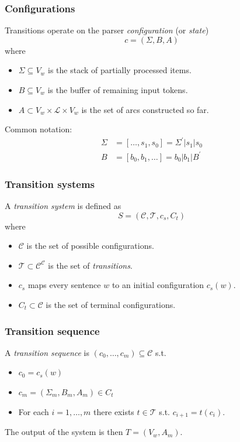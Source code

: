 \documentclass[t]{beamer}
\begin{document}
\begin{frame}
  \frametitle{Configurations}
  Transitions operate on the parser \textit{configuration} (or \textit{state})
  \[
    c = (\Sigma, B, A)
  \]
  where
  \begin{itemize}
    \item $\Sigma \subseteq V_w$ is the stack of partially processed items.
    \item $B \subseteq V_w$ is the buffer of remaining input tokens.
    \item $A \subset V_w \times \mathcal{L} \times V_w$ is the set of arcs constructed so far.
  \end{itemize}
  
  \pause\vfill
  
  Common notation:
  \begin{equation*}
  \begin{split}
      \Sigma&=[\ldots,s_1,s_0]=\Sigma^\prime|s_1|s_0 \\
      B&=[b_0,b_1,\ldots]=b_0|b_1|B^\prime
  \end{split}
  \end{equation*}
\end{frame}

\begin{frame}
  \frametitle{Transition systems}  
  
  A \textit{transition system} is defined as
  \[
    S = (\mathcal{C}, \mathcal{T}, c_s, C_t)
  \]
  where
  \begin{itemize}
    \item $\mathcal{C}$ is the set of possible configurations.
    \item $\mathcal{T} \subset \mathcal{C}^\mathcal{C}$ is the set of \textit{transitions}.
    \item $c_s$ maps every sentence $w$ to an initial configuration $c_s(w)$.
    \item $C_t \subset \mathcal{C}$ is the set of terminal configurations.
  \end{itemize}
\end{frame}

\begin{frame}
  \frametitle{Transition sequence}  
  A \textit{transition sequence} is $(c_0, \ldots, c_m) \subseteq \mathcal{C}$ s.t.
  \begin{itemize}
    \item $c_0 = c_s(w)$
    \item $c_m = (\Sigma_m, B_m, A_m) \in C_t$
    \item For each $i=1,\ldots,m$ there exists $t\in \mathcal{T}$ s.t. $c_{i+1}=t(c_i)$.
  \end{itemize}
  
  The output of the system is then $T=(V_w,A_m)$.
\end{frame}
\end{document}

